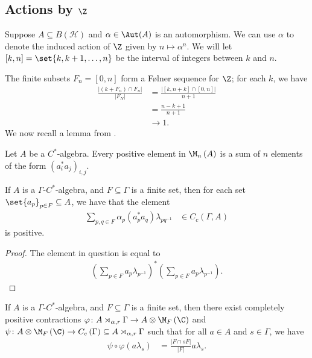 \documentclass[10pt]{mypackage}
\begin{document}
\subsection{Actions by $\Z$}%
Suppose $A\subseteq B( \mathcal{H} )$ and $\alpha\in \Aut(A)$ is an automorphism. We can use $\alpha$ to denote the induced action of $\Z$ given by $n\mapsto \alpha^{n}$. We will let $\left[ k,n \right] = \set{k,k+1,\dots,n}$ be the interval of integers between $k$ and $n$.

The finite subsets $F_n = \left[ 0,n \right]$ form a Følner sequence for $\Z$; for each $k$, we have
\begin{align*}
  \frac{\left\vert \left( k+F_n \right)\cap F_n \right\vert}{\left\vert F_N \right\vert} &= \frac{\left\vert \left[ k,n+k \right]\cap \left[ 0,n \right] \right\vert}{n+1}\\
                                                                                         &= \frac{n-k+1}{n+1}\\
                                                                                         &\rightarrow 1.
\end{align*}
We now recall a lemma from \cite{paulsen_completely_bounded_maps}.
\begin{lemma}
  Let $A$ be a $C^{\ast}$-algebra. Every positive element in $\M_n\left( A \right)$ is a sum of $n$ elements of the form $\left( a_i^{\ast}a_j \right)_{i,j}$.
\end{lemma}
\begin{lemma}
  If $A$ is a $\Gamma$-$C^{\ast}$-algebra, and $F\subseteq \Gamma$ is a finite set, then for each set $\set{a_p}_{p\in F}\subseteq A$, we have that the element
  \begin{align*}
    \sum_{p,q\in F} \alpha_p\left( a_p^{\ast}a_q \right)\lambda_{pq^{-1}} &\in C_c\left( \Gamma,A \right)
  \end{align*}
  is positive.
\end{lemma}
\begin{proof}
  The element in question is equal to
  \begin{align*}
    \left( \sum_{p\in F}a_p\lambda_{p^{-1}} \right)^{\ast}\left( \sum_{p\in F}a_p\lambda_{p^{-1}} \right).
  \end{align*}
\end{proof}
\begin{lemma}
  If $A$ is a $\Gamma$-$C^{\ast}$-algebra, and $F\subseteq \Gamma$ is a finite set, then there exist completely positive contractions $\varphi\colon A\rtimes_{\alpha,r}\Gamma\rightarrow A\otimes \M_F\left( \C \right)$ and $\psi\colon A\otimes \M_F\left( \C \right)\rightarrow C_c\left( \Gamma \right)\subseteq A\rtimes_{\alpha,r}\Gamma$ such that for all $a\in A$ and $s\in \Gamma$, we have
  \begin{align*}
    \psi\circ\varphi\left( a\lambda_s \right) &= \frac{\left\vert F\cap sF \right\vert}{\left\vert F \right\vert}a\lambda_s.
  \end{align*}
\end{lemma}
\end{document}
